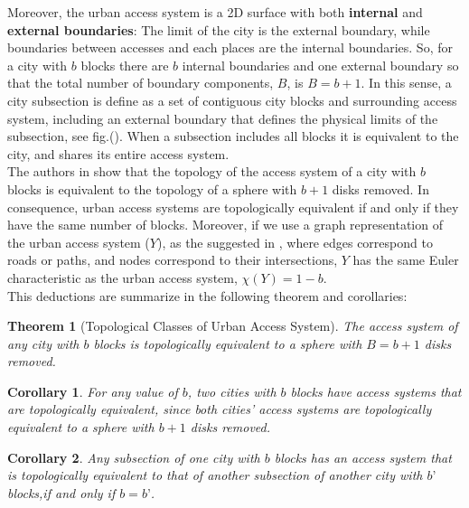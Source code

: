 \documentclass[10pt]{article}
\newtheorem{theorem}{Theorem}
\newtheorem{corollary}{Corollary}[theorem]
\begin{document}
Moreover, the urban access system is a 2D surface with both \textbf{internal} and \textbf{external boundaries}: The limit of the city is the external boundary, while boundaries between accesses and each places are the internal boundaries. So, for a city with $b$ blocks there are $b$ internal boundaries and one external boundary so that the total number of boundary components, $B$, is $B = b+1$. In this sense, a city subsection is define as a set of contiguous city blocks and surrounding access system, including an external boundary that defines the physical limits of the subsection, see fig.(). When a subsection includes all blocks it is equivalent to the city, and shares its entire access system.\\


The authors in \cite{bre} show that the topology of  the access system of a city with $b$ blocks is equivalent to the topology of a sphere with $b+1$ disks removed. In consequence, urban access systems are topologically equivalent if and only if they have the same number of blocks. Moreover, if we use a graph representation of the urban access system ($Y$), as the suggested in \cite{por}, where edges correspond to roads or paths, and nodes correspond to their intersections, $Y$ has the same Euler characteristic as the urban access system, $\chi(Y) = 1 - b$.\\

This deductions are summarize in the following theorem and corollaries:\\
\begin{theorem}[Topological Classes of Urban Access System]
The access system of any city with $b$ blocks is topologically equivalent to a sphere with $B=b+1$ disks removed.
\end{theorem}

\begin{corollary}
    For any value of $b$, two cities with $b$ blocks have access systems that are topologically equivalent, since both cities’ access systems are topologically equivalent to a sphere with $b+1$ disks removed.
\end{corollary}

\begin{corollary}
    Any subsection of one city with $b$ blocks has an access system that is topologically equivalent to that of another subsection of another city with $b’$ blocks,if and only if $b=b’$.
\end{corollary}
\end{document}
